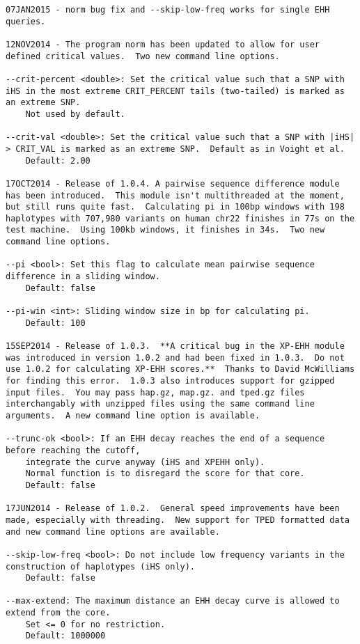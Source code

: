 \documentclass[12pt]{article}%
\begin{document}
\begin{lstlisting}
07JAN2015 - norm bug fix and --skip-low-freq works for single EHH queries.

12NOV2014 - The program norm has been updated to allow for user defined critical values.  Two new command line options.

--crit-percent <double>: Set the critical value such that a SNP with iHS in the most extreme CRIT_PERCENT tails (two-tailed) is marked as an extreme SNP.
	Not used by default.

--crit-val <double>: Set the critical value such that a SNP with |iHS| > CRIT_VAL is marked as an extreme SNP.  Default as in Voight et al.
	Default: 2.00

17OCT2014 - Release of 1.0.4. A pairwise sequence difference module has been introduced.  This module isn't multithreaded at the moment, but still runs quite fast.  Calculating pi in 100bp windows with 198 haplotypes with 707,980 variants on human chr22 finishes in 77s on the test machine.  Using 100kb windows, it finishes in 34s.  Two new command line options.

--pi <bool>: Set this flag to calculate mean pairwise sequence difference in a sliding window.
	Default: false

--pi-win <int>: Sliding window size in bp for calculating pi.
	Default: 100

15SEP2014 - Release of 1.0.3.  **A critical bug in the XP-EHH module was introduced in version 1.0.2 and had been fixed in 1.0.3.  Do not use 1.0.2 for calculating XP-EHH scores.**  Thanks to David McWilliams for finding this error.  1.0.3 also introduces support for gzipped input files.  You may pass hap.gz, map.gz. and tped.gz files interchangably with unzipped files using the same command line arguments.  A new command line option is available.

--trunc-ok <bool>: If an EHH decay reaches the end of a sequence before reaching the cutoff,
	integrate the curve anyway (iHS and XPEHH only).
	Normal function is to disregard the score for that core.
	Default: false

17JUN2014 - Release of 1.0.2.  General speed improvements have been made, especially with threading.  New support for TPED formatted data and new command line options are available.

--skip-low-freq <bool>: Do not include low frequency variants in the construction of haplotypes (iHS only).
	Default: false

--max-extend: The maximum distance an EHH decay curve is allowed to extend from the core.
	Set <= 0 for no restriction.
	Default: 1000000


\end{lstlisting}
\end{document}

